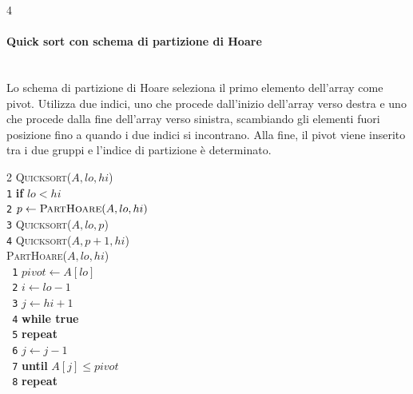 \documentclass[10pt,landscape]{article}
\newcommand{\myparagraph}[1]{\paragraph{#1}\mbox{}\\ [5pt]}
\begin{document}
\begin{multicols*}{4}
                \myparagraph{Quick sort con schema di partizione di Hoare}
                Lo schema di partizione di Hoare seleziona il primo elemento dell'array come pivot. Utilizza due indici, uno che procede dall'inizio dell'array verso destra e uno che procede dalla fine dell'array verso sinistra, scambiando gli elementi fuori posizione fino a quando i due indici si incontrano. Alla fine, il pivot viene inserito tra i due gruppi e l'indice di partizione è determinato.
                \begin{multicols}{2}
                        \textsc{Quicksort($A, lo, hi$)}\\ [3pt]
                        \verb|1|\hspace*{0.5em} \textbf{if} $lo < hi$\\
                        \verb|2|\hspace*{1.5em} $p \leftarrow \textsc{PartHoare}(A, lo, hi)$\\
                        \verb|3|\hspace*{1.5em} \textsc{Quicksort}($A, lo, p$)\\
                        \verb|4|\hspace*{1.5em} \textsc{Quicksort}($A, p + 1, hi$)\\
                        \columnbreak
                        \textsc{PartHoare($A, lo, hi$)}\\ [3pt]
                        \verb| 1|\hspace*{0.5em} $pivot \leftarrow A[lo]$\\
                        \verb| 2|\hspace*{0.5em} $i \leftarrow lo - 1$\\
                        \verb| 3|\hspace*{0.5em} $j \leftarrow hi + 1$\\
                        \verb| 4|\hspace*{0.5em} \textbf{while true}\\
                        \verb| 5|\hspace*{1.5em} \textbf{repeat}\\
                        \verb| 6|\hspace*{2.5em} $j \leftarrow j - 1$\\
                        \verb| 7|\hspace*{2.5em} \textbf{until} $A[j] \le pivot$\\
                        \verb| 8|\hspace*{1.5em} \textbf{repeat}\\

\end{multicols}
\end{multicols*}
\end{document}
